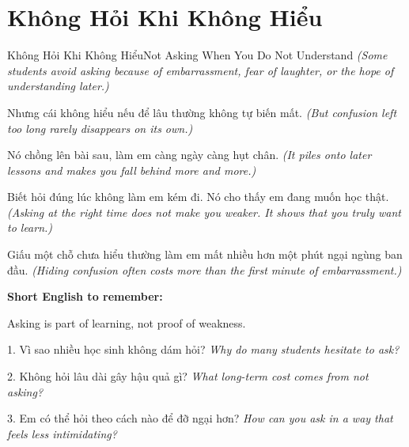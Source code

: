\section{Không Hỏi Khi Không Hiểu}
\begin{truyen}{Không Hỏi Khi Không Hiểu}{Not Asking When You Do Not Understand}
\textit{(Some students avoid asking because of embarrassment, fear of laughter, or the hope of understanding later.)}

Nhưng cái không hiểu nếu để lâu thường không tự biến mất.
\textit{(But confusion left too long rarely disappears on its own.)}

Nó chồng lên bài sau, làm em càng ngày càng hụt chân.
\textit{(It piles onto later lessons and makes you fall behind more and more.)}

Biết hỏi đúng lúc không làm em kém đi. Nó cho thấy em đang muốn học thật.
\textit{(Asking at the right time does not make you weaker. It shows that you truly want to learn.)}
\end{truyen}

\begin{baihoc}
Giấu một chỗ chưa hiểu thường làm em mất nhiều hơn một phút ngại ngùng ban đầu.
\textit{(Hiding confusion often costs more than the first minute of embarrassment.)}
\end{baihoc}

\begin{ghinhoanh}
\textbf{Short English to remember:}

Asking is part of learning, not proof of weakness.

\end{ghinhoanh}

\begin{tuhocnhanh}
1. Vì sao nhiều học sinh không dám hỏi? \textit{Why do many students hesitate to ask?}

2. Không hỏi lâu dài gây hậu quả gì? \textit{What long-term cost comes from not asking?}

3. Em có thể hỏi theo cách nào để đỡ ngại hơn? \textit{How can you ask in a way that feels less intimidating?}
\end{tuhocnhanh}
\ngancach

